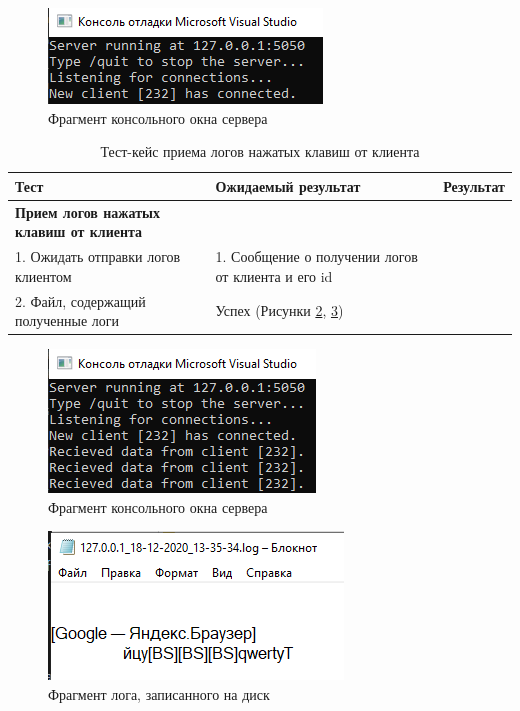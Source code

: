 \begin{figure}[!htb]
	\centering
	  \includegraphics[scale=1]{attachments/clientconnect.png}  
	  \caption{ Фрагмент консольного окна сервера }
	  \label{sec:testing:func:clientconnect}
\end{figure}

\begin{table}[ht]
	\caption{Тест-кейс приема логов нажатых клавиш от клиента}
	\label{table:testing:func:test3}
	\centering
	  \begin{tabular}{| >{\raggedright}m{} 
					  | >{\raggedright}m{} 
					  | >{\raggedright\arraybackslash}m{}|}
	  \hline Тест & Ожидаемый результат  & Результат \\
	  \hline \textbf{Прием логов нажатых клавиш от клиента} \\ 1. Ожидать отправки логов клиентом & 1. Сообщение о получении логов от клиента и его id \\ 2. Файл, содержащий полученные логи & Успех (Рисунки \ref*{sec:testing:func:clientSent}, \ref*{sec:testing:func:logFile})\\
	  \hline
	  \end{tabular}
\end{table}

\begin{figure}[ht]
	\centering
	  \includegraphics[scale=1]{attachments/clientSent.png}  
	  \caption{ Фрагмент консольного окна сервера }
	  \label{sec:testing:func:clientSent}
\end{figure}

\begin{figure}[ht]
	\centering
	  \includegraphics[scale=1]{attachments/logFile.png}  
	  \caption{ Фрагмент лога, записанного на диск }
	  \label{sec:testing:func:logFile}
\end{figure}

